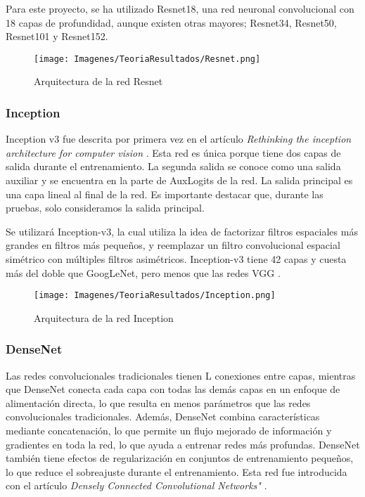 \documentclass{report}
\begin{document}
Para este proyecto, se ha utilizado Resnet18, una red neuronal convolucional con 18 capas de profundidad, aunque existen otras mayores; Resnet34, Resnet50, Resnet101 y Resnet152.

\vspace{1.2cm}
\begin{figure}[H]
    \centering
    \texttt{[image: Imagenes/TeoriaResultados/Resnet.png]}
    \caption{Arquitectura de la red Resnet \cite{ResNetArchitectureImage} }
    \label{fig:Resnet}
\end{figure}
\vspace{0.4cm}


\newpage
\subsubsection{Inception}

Inception v3 fue descrita por primera vez en el artículo \textit{Rethinking the inception architecture for computer vision} \cite{InceptionPaper}. Esta red es única porque tiene dos capas de salida durante el entrenamiento. La segunda salida se conoce como una salida auxiliar y se encuentra en la parte de AuxLogits de la red. La salida principal es una capa lineal al final de la red. Es importante destacar que, durante las pruebas, solo consideramos la salida principal.

Se utilizará Inception-v3, la cual utiliza la idea de factorizar filtros espaciales más grandes en filtros más pequeños, y reemplazar un filtro convolucional espacial simétrico con múltiples filtros asimétricos. Inception-v3 tiene 42 capas y cuesta más del doble que GoogLeNet, pero menos que las redes VGG \cite{PaperComparesModelsPapers}.

\vspace{1.2cm}
\begin{figure}[H]
    \centering
    \texttt{[image: Imagenes/TeoriaResultados/Inception.png]}
    \caption{Arquitectura de la red Inception \cite{InceptionPaper}}
    \label{fig:Inception}
\end{figure}
\vspace{0.4cm}


\newpage
\subsubsection{DenseNet}

Las redes convolucionales tradicionales tienen L conexiones entre capas, mientras que DenseNet conecta cada capa con todas las demás capas en un enfoque de alimentación directa, lo que resulta en menos parámetros que las redes convolucionales tradicionales. Además, DenseNet combina características mediante concatenación, lo que permite un flujo mejorado de información y gradientes en toda la red, lo que ayuda a entrenar redes más profundas. DenseNet también tiene efectos de regularización en conjuntos de entrenamiento pequeños, lo que reduce el sobreajuste durante el entrenamiento. Esta red fue introducida con el artículo \textit{Densely Connected Convolutional Networks"} \cite{DenseNetPaper}.
\end{document}
